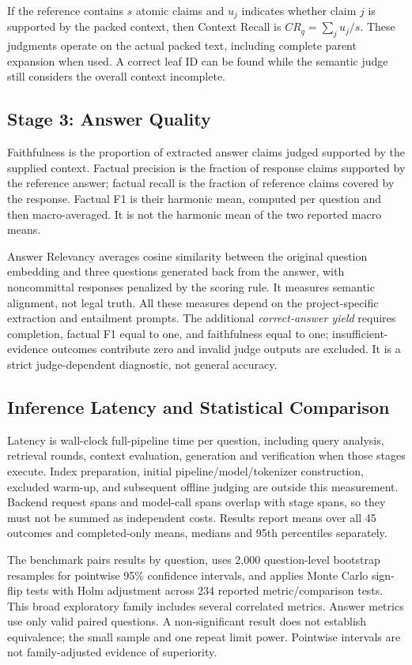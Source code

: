 If the reference contains $s$ atomic claims and $u_j$ indicates whether claim $j$ is supported by the packed context, then Context Recall is $CR_q=\sum_j u_j/s$. These judgments operate on the actual packed text, including complete parent expansion when used. A correct leaf ID can be found while the semantic judge still considers the overall context incomplete.

\subsection{Stage 3: Answer Quality}
Faithfulness is the proportion of extracted answer claims judged supported by the supplied context. Factual precision is the fraction of response claims supported by the reference answer; factual recall is the fraction of reference claims covered by the response. Factual F1 is their harmonic mean, computed per question and then macro-averaged. It is not the harmonic mean of the two reported macro means.

Answer Relevancy averages cosine similarity between the original question embedding and three questions generated back from the answer, with noncommittal responses penalized by the scoring rule. It measures semantic alignment, not legal truth. All these measures depend on the project-specific extraction and entailment prompts. The additional \textit{correct-answer yield} requires completion, factual F1 equal to one, and faithfulness equal to one; insufficient-evidence outcomes contribute zero and invalid judge outputs are excluded. It is a strict judge-dependent diagnostic, not general accuracy.

\subsection{Inference Latency and Statistical Comparison}
Latency is wall-clock full-pipeline time per question, including query analysis, retrieval rounds, context evaluation, generation and verification when those stages execute. Index preparation, initial pipeline/model/tokenizer construction, excluded warm-up, and subsequent offline judging are outside this measurement. Backend request spans and model-call spans overlap with stage spans, so they must not be summed as independent costs. Results report means over all 45 outcomes and completed-only means, medians and 95th percentiles separately.

The benchmark pairs results by question, uses 2,000 question-level bootstrap resamples for pointwise 95\% confidence intervals, and applies Monte Carlo sign-flip tests with Holm adjustment across 234 reported metric/comparison tests. This broad exploratory family includes several correlated metrics. Answer metrics use only valid paired questions. A non-significant result does not establish equivalence; the small sample and one repeat limit power. Pointwise intervals are not family-adjusted evidence of superiority.

